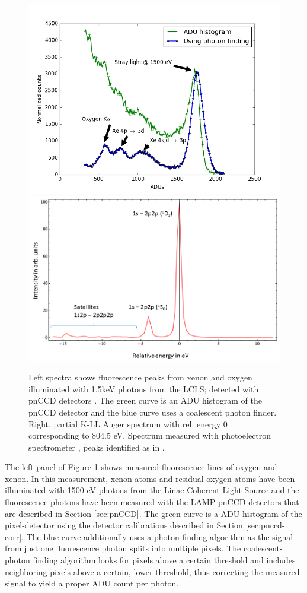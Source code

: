 \begin{figure}
	\centering
		\includegraphics[width=.49\textwidth]{images/pnCCD-histogram.png}
		\includegraphics[width=.49\textwidth]{images/auger-spectra.png}
	\caption[Fluorescence spectra from xenon and neon K-LL Auger spectrum.]{Left spectra shows fluorescence peaks from xenon and oxygen illuminated with 1.5keV photons from the LCLS; detected with pnCCD detectors \citep{Bucher-2016-Unpublished, Rudek-2012-NatPho}. The green curve is an ADU histogram of the pnCCD detector and the blue curve uses a coalescent photon finder. Right, partial K-LL Auger spectrum with rel. energy 0 corresponding to 804.5 eV. Spectrum measured with photoelectron spectrometer \citep{Bucher-2014-Unpublished}, peaks identified as in \citep{Krause-1970-PhysLettA}.}
	\label{fig:pnCCD-histogram}
\end{figure}
The left panel of Figure \ref{fig:pnCCD-histogram} shows measured fluorescence lines of oxygen and xenon. In this measurement, xenon atoms and residual oxygen atoms have been illuminated with 1500 eV photons from the Linac Coherent Light Source and the fluorescence photons have been measured with the LAMP pnCCD detectors that are described in Section \ref{sec:pnCCD}. The green curve is a ADU histogram of the pixel-detector using the detector calibrations described in Section \ref{sec:pnccd-corr}. The blue curve additionally uses a photon-finding algorithm as the signal from just one fluorescence photon splits into multiple pixels. The coalescent-photon finding algorithm looks for pixels above a certain threshold and includes neighboring pixels above a certain, lower threshold, thus correcting the measured signal to yield a proper ADU count per photon.\\[1\baselineskip]
